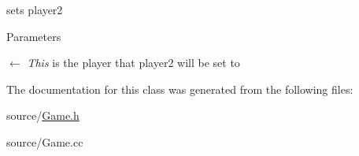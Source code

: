 sets player2 
\begin{DoxyParams}{Parameters}
\item[\mbox{$\leftarrow$} {\em This}]is the player that player2 will be set to \end{DoxyParams}


The documentation for this class was generated from the following files:\begin{DoxyCompactItemize}
\item 
source/\hyperlink{Game_8h}{Game.h}\item 
source/Game.cc\end{DoxyCompactItemize}
